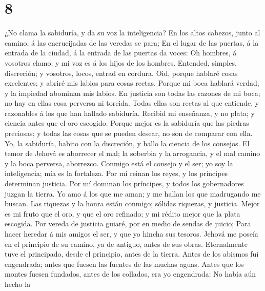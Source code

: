 \hypertarget{section-7}{%
\section{8}\label{section-7}}

 ¿No clama la sabiduría, y da su voz la inteligencia?
 En los altos cabezos, junto al camino, á las encrucijadas
de las veredas se para;  En el lugar de las puertas, á la
entrada de la ciudad, á la entrada de las puertas da voces:
 Oh hombres, á vosotros clamo; y mi voz es á los hijos de
los hombres.  Entended, simples, discreción; y vosotros,
locos, entrad en cordura.  Oid, porque hablaré cosas
excelentes; y abriré mis labios para cosas rectas.  Porque
mi boca hablará verdad, y la impiedad abominan mis labios.
 En justicia son todas las razones de mi boca; no hay en
ellas cosa perversa ni torcida.  Todas ellas son rectas al
que entiende, y razonables á los que han hallado sabiduría.
 Recibid mi enseñanza, y no plata; y ciencia antes que el
oro escogido.  Porque mejor es la sabiduría que las
piedras preciosas; y todas las cosas que se pueden desear, no son de
comparar con ella.  Yo, la sabiduría, habito con la
discreción, y hallo la ciencia de los consejos.  El temor
de Jehová es aborrecer el mal; la soberbia y la arrogancia, y el mal
camino y la boca perversa, aborrezco.  Conmigo está el
consejo y el ser; yo soy la inteligencia; mía es la fortaleza.
 Por mí reinan los reyes, y los príncipes determinan
justicia.  Por mí dominan los príncipes, y todos los
gobernadores juzgan la tierra.  Yo amo á los que me aman;
y me hallan los que madrugando me buscan.  Las riquezas y
la honra están conmigo; sólidas riquezas, y justicia. 
Mejor es mi fruto que el oro, y que el oro refinado; y mi rédito mejor
que la plata escogida.  Por vereda de justicia guiaré,
por en medio de sendas de juicio;  Para hacer heredar á
mis amigos el ser, y que yo hincha sus tesoros.  Jehová
me poseía en el principio de su camino, ya de antiguo, antes de sus
obras.  Eternalmente tuve el principado, desde el
principio, antes de la tierra.  Antes de los abismos fuí
engendrada; antes que fuesen las fuentes de las muchas aguas.
 Antes que los montes fuesen fundados, antes de los
collados, era yo engendrada:  No había aún hecho la
